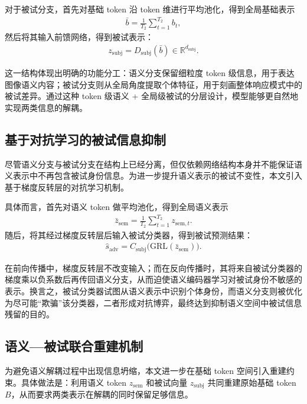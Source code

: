 对于被试分支，首先对基础 token 沿 token 维进行平均池化，得到全局基础表示
\begin{align}
  \bar{b} = \frac{1}{T_2} \sum_{t=1}^{T_2} b_t,
\end{align}
然后将其输入前馈网络，得到被试表示：
\begin{align}
  z_{\mathrm{subj}} = D_{\mathrm{subj}}(\bar{b}) \in \mathbb{R}^{d_{\mathrm{subj}}}.
\end{align}

这一结构体现出明确的功能分工：语义分支保留细粒度 token 级信息，用于表达图像语义内容；被试分支则从全局角度提取个体特征，用于刻画整体响应模式中的被试差异。通过这种 token 级语义 + 全局级被试的分层设计，模型能够更自然地实现两类信息的解耦。

\subsection{基于对抗学习的被试信息抑制}

尽管语义分支与被试分支在结构上已经分离，但仅依赖网络结构本身并不能保证语义表示中不再包含被试身份信息。为进一步提升语义表示的被试不变性，本文引入基于梯度反转层的对抗学习机制。

具体而言，首先对语义 token 做平均池化，得到全局语义表示
\begin{align}
  \bar{z}_{\mathrm{sem}} = \frac{1}{T_2} \sum_{t=1}^{T_2} z_{\mathrm{sem},t}.
\end{align}
随后，将其经过梯度反转层后输入被试分类器，得到被试预测结果：
\begin{align}
  \hat{s}_{\mathrm{adv}} = C_{\mathrm{subj}}\bigl(\mathrm{GRL}(\bar{z}_{\mathrm{sem}})\bigr).
\end{align}

在前向传播中，梯度反转层不改变输入；而在反向传播时，其将来自被试分类器的梯度乘以负系数后再传回语义分支，从而迫使语义编码器学习对被试身份不敏感的表示。换言之，被试分类器试图从语义表示中识别个体身份，而语义分支则被优化为尽可能“欺骗”该分类器，二者形成对抗博弈，最终达到抑制语义空间中被试信息残留的目的。

\subsection{语义—被试联合重建机制}

为避免语义解耦过程中出现信息坍缩，本文进一步在基础 token 空间引入重建约束。具体做法是：利用语义 token $z_{\mathrm{sem}}$ 和被试向量 $z_{\mathrm{subj}}$ 共同重建原始基础 token $B$，从而要求两类表示在解耦的同时保留足够信息。

